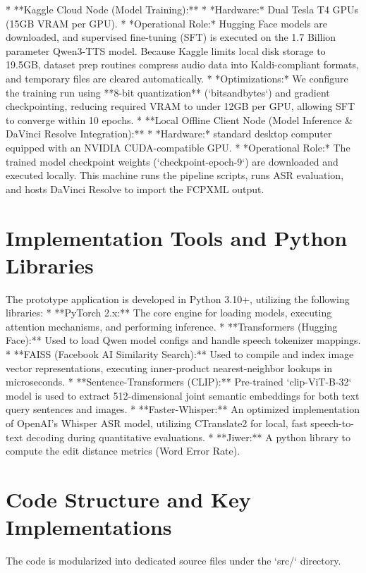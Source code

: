 \documentclass[a4paper,12pt]{report}
\begin{document}
* **Kaggle Cloud Node (Model Training):**
  * *Hardware:* Dual Tesla T4 GPUs (15GB VRAM per GPU).
  * *Operational Role:* Hugging Face models are downloaded, and supervised fine-tuning (SFT) is executed on the 1.7 Billion parameter Qwen3-TTS model. Because Kaggle limits local disk storage to 19.5GB, dataset prep routines compress audio data into Kaldi-compliant formats, and temporary files are cleared automatically.
  * *Optimizations:* We configure the training run using **8-bit quantization** (`bitsandbytes`) and gradient checkpointing, reducing required VRAM to under 12GB per GPU, allowing SFT to converge within 10 epochs.
* **Local Offline Client Node (Model Inference & DaVinci Resolve Integration):**
  * *Hardware:* standard desktop computer equipped with an NVIDIA CUDA-compatible GPU.
  * *Operational Role:* The trained model checkpoint weights (`checkpoint-epoch-9`) are downloaded and executed locally. This machine runs the pipeline scripts, runs ASR evaluation, and hosts DaVinci Resolve to import the FCPXML output.

\section{Implementation Tools and Python Libraries}
The prototype application is developed in Python 3.10+, utilizing the following libraries:
* **PyTorch 2.x:** The core engine for loading models, executing attention mechanisms, and performing inference.
* **Transformers (Hugging Face):** Used to load Qwen model configs and handle speech tokenizer mappings.
* **FAISS (Facebook AI Similarity Search):** Used to compile and index image vector representations, executing inner-product nearest-neighbor lookups in microseconds.
* **Sentence-Transformers (CLIP):** Pre-trained `clip-ViT-B-32` model is used to extract 512-dimensional joint semantic embeddings for both text query sentences and images.
* **Faster-Whisper:** An optimized implementation of OpenAI's Whisper ASR model, utilizing CTranslate2 for local, fast speech-to-text decoding during quantitative evaluations.
* **Jiwer:** A python library to compute the edit distance metrics (Word Error Rate).

\section{Code Structure and Key Implementations}
The code is modularized into dedicated source files under the `src/` directory.
\end{document}
